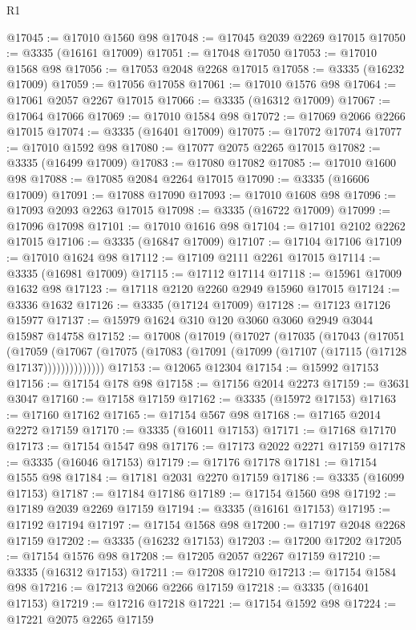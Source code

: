 \begin{lexlean}{R1}
\begin{coremodule}
@17045 := @17010 @1560 @98
@17048 := @17045 @2039 @2269 @17015
@17050 := @3335 (@16161 @17009)
@17051 := @17048 @17050
@17053 := @17010 @1568 @98
@17056 := @17053 @2048 @2268 @17015
@17058 := @3335 (@16232 @17009)
@17059 := @17056 @17058
@17061 := @17010 @1576 @98
@17064 := @17061 @2057 @2267 @17015
@17066 := @3335 (@16312 @17009)
@17067 := @17064 @17066
@17069 := @17010 @1584 @98
@17072 := @17069 @2066 @2266 @17015
@17074 := @3335 (@16401 @17009)
@17075 := @17072 @17074
@17077 := @17010 @1592 @98
@17080 := @17077 @2075 @2265 @17015
@17082 := @3335 (@16499 @17009)
@17083 := @17080 @17082
@17085 := @17010 @1600 @98
@17088 := @17085 @2084 @2264 @17015
@17090 := @3335 (@16606 @17009)
@17091 := @17088 @17090
@17093 := @17010 @1608 @98
@17096 := @17093 @2093 @2263 @17015
@17098 := @3335 (@16722 @17009)
@17099 := @17096 @17098
@17101 := @17010 @1616 @98
@17104 := @17101 @2102 @2262 @17015
@17106 := @3335 (@16847 @17009)
@17107 := @17104 @17106
@17109 := @17010 @1624 @98
@17112 := @17109 @2111 @2261 @17015
@17114 := @3335 (@16981 @17009)
@17115 := @17112 @17114
@17118 := @15961 @17009 @1632 @98
@17123 := @17118 @2120 @2260 @2949 @15960 @17015
@17124 := @3336 @1632
@17126 := @3335 (@17124 @17009)
@17128 := @17123 @17126 @15977
@17137 := @15979 @1624 @310 @120 @3060 @3060 @2949 @3044 @15987 @14758
@17152 := @17008
    (@17019
      (@17027
        (@17035
          (@17043
            (@17051
              (@17059
                (@17067 (@17075 (@17083 (@17091 (@17099 (@17107 (@17115 (@17128 @17137))))))))))))))
@17153 := @12065 @12304
@17154 := @15992 @17153
@17156 := @17154 @178 @98
@17158 := @17156 @2014 @2273
@17159 := @3631 @3047
@17160 := @17158 @17159
@17162 := @3335 (@15972 @17153)
@17163 := @17160 @17162
@17165 := @17154 @567 @98
@17168 := @17165 @2014 @2272 @17159
@17170 := @3335 (@16011 @17153)
@17171 := @17168 @17170
@17173 := @17154 @1547 @98
@17176 := @17173 @2022 @2271 @17159
@17178 := @3335 (@16046 @17153)
@17179 := @17176 @17178
@17181 := @17154 @1555 @98
@17184 := @17181 @2031 @2270 @17159
@17186 := @3335 (@16099 @17153)
@17187 := @17184 @17186
@17189 := @17154 @1560 @98
@17192 := @17189 @2039 @2269 @17159
@17194 := @3335 (@16161 @17153)
@17195 := @17192 @17194
@17197 := @17154 @1568 @98
@17200 := @17197 @2048 @2268 @17159
@17202 := @3335 (@16232 @17153)
@17203 := @17200 @17202
@17205 := @17154 @1576 @98
@17208 := @17205 @2057 @2267 @17159
@17210 := @3335 (@16312 @17153)
@17211 := @17208 @17210
@17213 := @17154 @1584 @98
@17216 := @17213 @2066 @2266 @17159
@17218 := @3335 (@16401 @17153)
@17219 := @17216 @17218
@17221 := @17154 @1592 @98
@17224 := @17221 @2075 @2265 @17159

\end{coremodule}
\end{lexlean}
